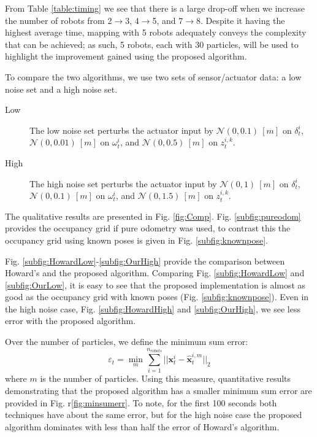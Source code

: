 From Table \ref{table:timing} we see that there is a large drop-off when we increase the number of robots from 2$\rightarrow$3, 4$\rightarrow$5, and 7$\rightarrow$8.  Despite it having the highest average time, mapping with 5 robots adequately conveys the complexity that can be achieved; as such, 5 robots, each with 30 particles, will be used to highlight the improvement gained using the proposed algorithm.  

To compare the two algorithms, we use two sets of sensor/actuator data: a low noise set and a high noise set. 
\begin{description}
\item[Low] The low noise set perturbs the actuator input by $\mathcal{N}(0,0.1)\ [m]$ on $\delta_t^{i}$, $\mathcal{N}(0,0.01)\ [m]$ on $\omega_t^{i}$, and $\mathcal{N}(0,0.5)\ [m]$ on $z_t^{i,k}$.  
\item[High] The high noise set perturbs the actuator input by $\mathcal{N}(0,1)\ [m]$ on $\delta_t^{i}$, $\mathcal{N}(0,0.1)\ [m]$ on $\omega_t^{i}$, and $\mathcal{N}(0,1.5)\ [m]$ on $z_t^{i,k}$.
\end{description}

The qualitative results are presented in Fig. \ref{fig:Comp}.  Fig. \ref{subfig:pureodom} provides the occupancy grid if pure odometry was used, to contrast this the occupancy grid using known poses is given in Fig. \ref{subfig:knownpose}.  

Fig. \ref{subfig:HowardLow}-\ref{subfig:OurHigh} provide the comparison between Howard's and the proposed algorithm.  Comparing Fig. \ref{subfig:HowardLow} and \ref{subfig:OurLow}, it is easy to see that the proposed implementation is almost as good as the occupancy grid with known poses (Fig. \ref{subfig:knownpose}).  Even in the high noise case, Fig. \ref{subfig:HowardHigh} and \ref{subfig:OurHigh}, we see less error with the proposed algorithm.  

Over the number of particles, we define the minimum sum error:
\begin{equation}
\varepsilon_{t}=\min_{m} \sum_{i=1}^{n_{robots}} ||\textbf{x}_t^i-\hat{\textbf{x}}_t^{i,m}||_2
\end{equation}
where $m$ is the number of particles.  Using this measure, quantitative results demonstrating that the proposed algorithm has a smaller minimum sum error are provided in Fig. r\ref{fig:minsumerr}.  To note, for the first 100 seconds both techniques have about the same error, but for the high noise case the proposed algorithm dominates with less than half the error of Howard's algorithm.



